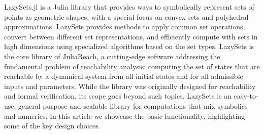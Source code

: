 LazySets.jl is a Julia library that provides ways to symbolically represent sets of points as geometric shapes, with a special focus on convex sets and polyhedral approximations. LazySets provides methods to apply common set operations, convert between different set representations, and efficiently compute with sets in high dimensions using specialized algorithms based on the set types.
%
LazySets is the core library of JuliaReach, a cutting-edge software addressing the fundamental problem of reachability analysis: computing the set of states that are reachable by a dynamical system from all initial states and for all admissible inputs and parameters.
%
While the library was originally designed for reachability and formal verification, its scope goes beyond such topics.
%
LazySets is an easy-to-use, general-purpose and scalable library for computations that mix symbolics and numerics.
%
In this article we showcase the basic functionality, highlighting some of the key design choices.


